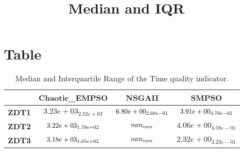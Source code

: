 \documentclass{article}
\title{Median and IQR}
\author{}
\begin{document}
\maketitle
\section{Table}
\begin{table}[!htp]
  \caption{Median and Interquartile Range of the Time quality indicator.}
  \label{table:Time}
  \centering
  \begin{scriptsize}
  \begin{tabular}{c|ccc}
      & \textbf{Chaotic\_EMPSO} & \textbf{NSGAII} & \textbf{SMPSO} \\\hline
      \textbf{ZDT1} & $3.23e+03_{2.52e+02} $ & $ \cellcolor{gray25} 6.80e+00_{2.68e-01} $ & $ \cellcolor{gray95} 3.91e+00_{4.70e-01}$ \\
      \textbf{ZDT2} & $\cellcolor{gray95} 3.22e+03_{1.78e+02} $ & $ \cellcolor{gray25} nan_{nan} $ & $ 4.06e+00_{4.58e-01}$ \\
      \textbf{ZDT3} & $\cellcolor{gray95} 3.18e+03_{1.65e+02} $ & $ \cellcolor{gray25} nan_{nan} $ & $ 2.32e+00_{3.23e-01}$ \\
  \end{tabular}
  \end{scriptsize}
\end{table}
\end{document}
